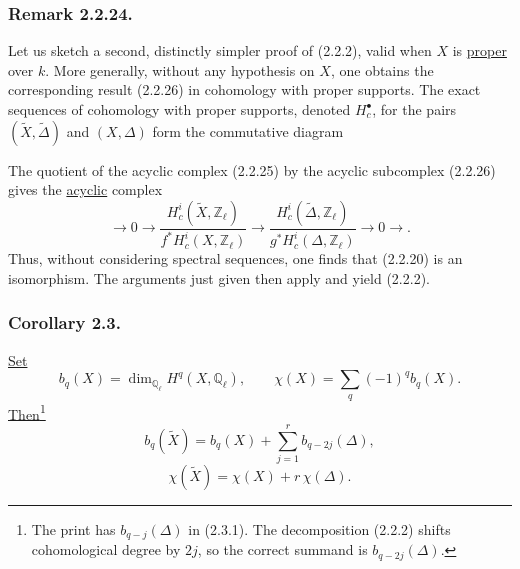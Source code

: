 \subsubsection*{Remark 2.2.24.}
Let us sketch a second, distinctly simpler proof of (2.2.2), valid when $X$
is \underline{proper} over $k$. More generally, without any hypothesis on
$X$, one obtains the corresponding result (2.2.26) in cohomology with proper
supports. The exact sequences of cohomology with proper supports, denoted
$H_c^\bullet$, for the pairs
$(\widetilde X,\widetilde\Delta)$ and $(X,\Delta)$ form the commutative
diagram
\begin{center}
\end{center}
The quotient of the acyclic complex (2.2.25) by the acyclic subcomplex
(2.2.26) gives the \underline{acyclic} complex
\begin{equation}\tag{2.2.27}
\longrightarrow 0\longrightarrow
\frac{H_c^i(\widetilde X,\mathbb Z_\ell)}
     {f^*H_c^i(X,\mathbb Z_\ell)}
\longrightarrow
\frac{H_c^i(\widetilde\Delta,\mathbb Z_\ell)}
     {g^*H_c^i(\Delta,\mathbb Z_\ell)}
\longrightarrow0\longrightarrow.
\end{equation}
Thus, without considering spectral sequences, one finds that (2.2.20) is an
isomorphism. The arguments just given then apply and yield (2.2.2).

\subsubsection*{Corollary 2.3.}
\underline{Set}
\[
b_q(X)=\dim_{\mathbb Q_\ell}H^q(X,\mathbb Q_\ell),
\qquad
\chi(X)=\sum_q(-1)^qb_q(X).
\]
\underline{Then}\footnote{The print has $b_{q-j}(\Delta)$ in (2.3.1).
The decomposition (2.2.2) shifts cohomological degree by $2j$, so the
correct summand is $b_{q-2j}(\Delta)$.}
\begin{equation}\tag{2.3.1}
b_q(\widetilde X)
=b_q(X)+\sum_{j=1}^{r}b_{q-2j}(\Delta),
\end{equation}
\begin{equation}\tag{2.3.2}
\chi(\widetilde X)=\chi(X)+r\,\chi(\Delta).
\end{equation}
